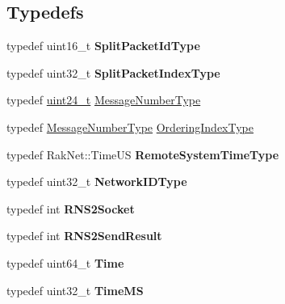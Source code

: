 \subsection*{Typedefs}
\begin{DoxyCompactItemize}
\item 
\hypertarget{namespace_rak_net_a6b22fe44e57aabe547fe36080cfa87af}{typedef uint16\-\_\-t {\bfseries Split\-Packet\-Id\-Type}}\label{namespace_rak_net_a6b22fe44e57aabe547fe36080cfa87af}

\item 
\hypertarget{namespace_rak_net_a0c2838ac170e76a3889eef7e5bb98237}{typedef uint32\-\_\-t {\bfseries Split\-Packet\-Index\-Type}}\label{namespace_rak_net_a0c2838ac170e76a3889eef7e5bb98237}

\item 
typedef \hyperlink{struct_rak_net_1_1uint24__t}{uint24\-\_\-t} \hyperlink{namespace_rak_net_a48a622d2efad1d8be8e1fbc5e8e433db}{Message\-Number\-Type}
\item 
typedef \hyperlink{namespace_rak_net_a48a622d2efad1d8be8e1fbc5e8e433db}{Message\-Number\-Type} \hyperlink{namespace_rak_net_a2420990844ae2bee638d55b6834baa75}{Ordering\-Index\-Type}
\item 
\hypertarget{namespace_rak_net_a6549a63aa42e97fa31576473317d6942}{typedef Rak\-Net\-::\-Time\-U\-S {\bfseries Remote\-System\-Time\-Type}}\label{namespace_rak_net_a6549a63aa42e97fa31576473317d6942}

\item 
\hypertarget{namespace_rak_net_ac055d37446512c568470bde0c081f673}{typedef uint32\-\_\-t {\bfseries Network\-I\-D\-Type}}\label{namespace_rak_net_ac055d37446512c568470bde0c081f673}

\item 
\hypertarget{namespace_rak_net_acee04f14a08ce61cebbc996e73f5303b}{typedef int {\bfseries R\-N\-S2\-Socket}}\label{namespace_rak_net_acee04f14a08ce61cebbc996e73f5303b}

\item 
\hypertarget{namespace_rak_net_a366d632e7f2282d5047e1b16e0b63515}{typedef int {\bfseries R\-N\-S2\-Send\-Result}}\label{namespace_rak_net_a366d632e7f2282d5047e1b16e0b63515}

\item 
\hypertarget{namespace_rak_net_a74e8f1c95f15926f48ed48a0b38a7bf7}{typedef uint64\-\_\-t {\bfseries Time}}\label{namespace_rak_net_a74e8f1c95f15926f48ed48a0b38a7bf7}

\item 
\hypertarget{namespace_rak_net_a853d1ec70eb48e409f5ebed82d842b40}{typedef uint32\-\_\-t {\bfseries Time\-M\-S}}\label{namespace_rak_net_a853d1ec70eb48e409f5ebed82d842b40}


\end{DoxyCompactItemize}
